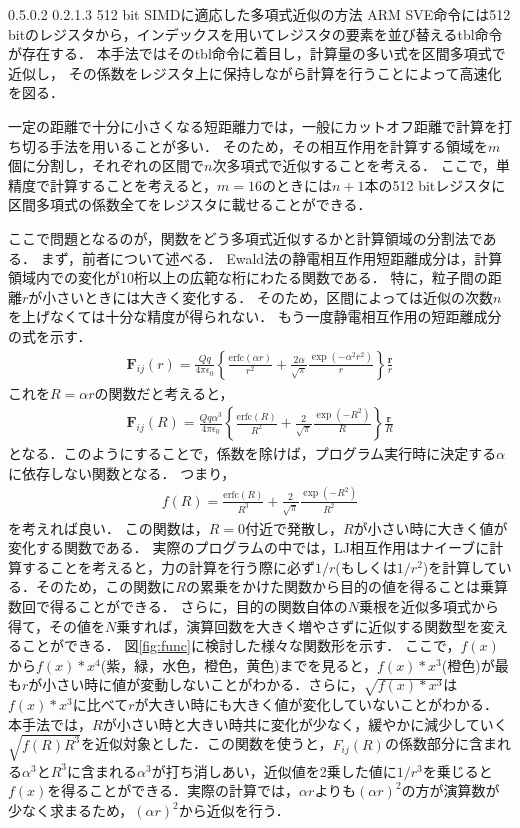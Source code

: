 \documentclass[uplatex,11pt,a4j,titlepage,oneside,openright,dvipdfmx]{jsbook}
\makeatletter
\renewcommand{\section}{%
   \@startsection{section}{1}{\z@}%
   {0.5\Cvs \@plus.0\Cdp \@minus.2\Cdp}%
   {0.2\Cvs \@plus.1\Cdp \@minus.3\Cdp}%
   {\reset@font\large\bfseries}}%
\makeatother
\begin{document}
\section{512 bit SIMDに適応した多項式近似の方法}
ARM SVE命令には512 bitのレジスタから，インデックスを用いてレジスタの要素を並び替えるtbl命令が存在する．
本手法ではそのtbl命令に着目し，計算量の多い式を区間多項式で近似し，
その係数をレジスタ上に保持しながら計算を行うことによって高速化を図る．

一定の距離で十分に小さくなる短距離力では，一般にカットオフ距離で計算を打ち切る手法を用いることが多い．
そのため，その相互作用を計算する領域を$m$個に分割し，それぞれの区間で$n$次多項式で近似することを考える．
ここで，単精度で計算することを考えると，$m=16$のときには$n+1$本の512 bitレジスタに区間多項式の係数全てをレジスタに載せることができる．

ここで問題となるのが，関数をどう多項式近似するかと計算領域の分割法である．
まず，前者について述べる．
Ewald法の静電相互作用短距離成分は，計算領域内での変化が10桁以上の広範な桁にわたる関数である．
特に，粒子間の距離$r$が小さいときには大きく変化する．
そのため，区間によっては近似の次数$n$を上げなくては十分な精度が得られない．
もう一度静電相互作用の短距離成分の式を示す．
\begin{eqnarray}
 \bm{F}_{ij}(r) = \frac{Qq}{4\pi\epsilon_0} \left\{ \frac{\mathrm{erfc}(\alpha r)}{r^2} + \frac{2\alpha}{\sqrt{\pi}}\frac{\exp(-\alpha^2r^2)}{r}\right\}\frac{\bm{r}}{r}
\end{eqnarray}
これを$R=\alpha r$の関数だと考えると，
\begin{eqnarray}
 \bm{F}_{ij}(R) = \frac{Qq \alpha^3}{4\pi\epsilon_0} \left\{ \frac{\mathrm{erfc}(R)}{R^2} + \frac{2}{\sqrt{\pi}}\frac{\exp(-R^2)}{R}\right\}\frac{\bm{r}}{R}
\end{eqnarray}
となる．このようにすることで，係数を除けば，プログラム実行時に決定する$\alpha$に依存しない関数となる．
つまり，
\begin{eqnarray}
 f(R) = \frac{\mathrm{erfc}(R)}{R^3} + \frac{2}{\sqrt{\pi}}\frac{\exp(-R^2)}{R^2}
\end{eqnarray}
を考えれば良い．
この関数は，$R=0$付近で発散し，$R$が小さい時に大きく値が変化する関数である．
実際のプログラムの中では，LJ相互作用はナイーブに計算することを考えると，力の計算を行う際に必ず$1/r$(もしくは$1/r^2$)を計算している．そのため，この関数に$R$の累乗をかけた関数から目的の値を得ることは乗算数回で得ることができる．
さらに，目的の関数自体の$N$乗根を近似多項式から得て，その値を$N$乗すれば，演算回数を大きく増やさずに近似する関数型を変えることができる．
図\ref{fig:func}に検討した様々な関数形を示す．
ここで，$f(x)$から$f(x)*x^4$(紫，緑，水色，橙色，黄色)までを見ると，$f(x)*x^3$(橙色)が最も$r$が小さい時に値が変動しないことがわかる．さらに，$\sqrt{f(x)*x^3}$は$f(x)*x^3$に比べて$r$が大きい時にも大きく値が変化していないことがわかる．
本手法では，$R$が小さい時と大きい時共に変化が少なく，緩やかに減少していく$\sqrt{f(R)R^3}$を近似対象とした．この関数を使うと，$F_{ij}(R)$の係数部分に含まれる$\alpha^3$と$R^3$に含まれる$\alpha^3$が打ち消しあい，近似値を2乗した値に$1/r^3$を乗じると$f(x)$を得ることができる．実際の計算では，$\alpha r$よりも$(\alpha r)^2$の方が演算数が少なく求まるため，$(\alpha r)^2$から近似を行う．
\end{document}
